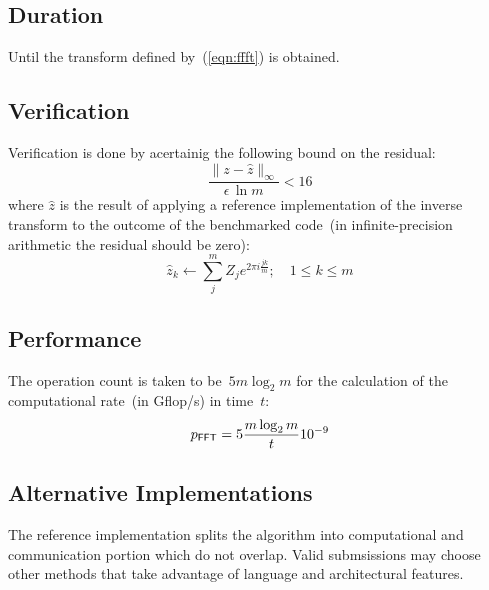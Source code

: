 \documentclass[twocolumn,draft]{article}
\newcommand{\fft}{\textsf{\scriptsize FFT}\xspace}
\begin{document}
\subsection{Duration}
Until the transform defined by~(\ref{eqn:ffft}) is obtained.

\subsection{Verification}
Verification is done by acertainig the following bound on the residual:
\begin{equation}
\frac{\|z-\hat{z}\|_{\infty}}{\epsilon\,\ln m} < 16
\end{equation}
where $\hat{z}$ is the result of applying a reference implementation of the
inverse transform to the outcome of the benchmarked code~(in infinite-precision
arithmetic the residual should be zero):
\begin{equation}
\hat{z}_k\leftarrow\sum_j^m Z_j e^{2\pi i\frac{jk}{m}}; \quad 1 \le k \le m
\end{equation}

\subsection{Performance}
The operation count is taken to be~$5m\log_2 m$ for the calculation of the
computational rate~(in Gflop/s) in time~$t$:
\begin{equation}
  p_{\fft}=5\frac{m\log_2 m}{t}10^{-9}
\end{equation}

\subsection{Alternative Implementations}
The reference implementation splits the algorithm into computational and
communication portion which do not overlap. Valid submsissions may choose other
methods that take advantage of language and architectural features.
\end{document}
